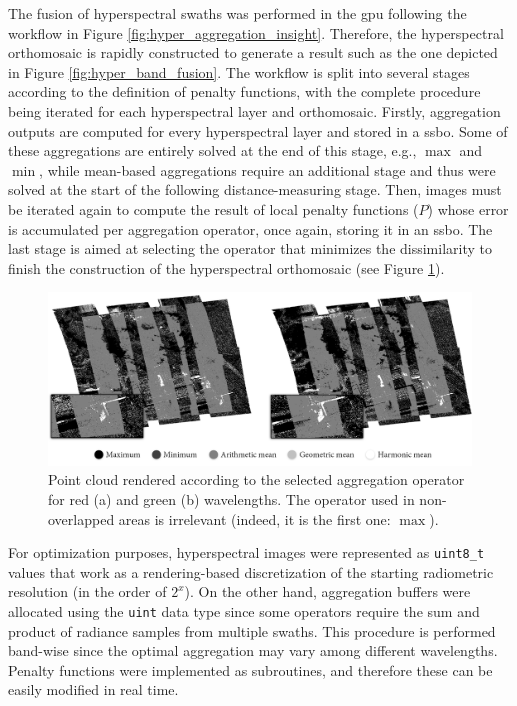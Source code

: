 The fusion of hyperspectral swaths was performed in the \acrshort{gpu} following the workflow in Figure \ref{fig:hyper_aggregation_insight}. Therefore, the hyperspectral orthomosaic is rapidly constructed to generate a result such as the one depicted in Figure \ref{fig:hyper_band_fusion}. The workflow is split into several stages according to the definition of penalty functions, with the complete procedure being iterated for each hyperspectral layer and orthomosaic. Firstly, aggregation outputs are computed for every hyperspectral layer and stored in a \acrshort{ssbo}. Some of these aggregations are entirely solved at the end of this stage, e.g., $\max$ and $\min$, while mean-based aggregations require an additional stage and thus were solved at the start of the following distance-measuring stage. Then, images must be iterated again to compute the result of local penalty functions ($P$) whose error is accumulated per aggregation operator, once again, storing it in an \acrshort{ssbo}. The last stage is aimed at selecting the operator that minimizes the dissimilarity to finish the construction of the hyperspectral orthomosaic (see Figure \ref{fig:hyper_aggregation_selection}). 

\begin{figure}[hbt]
    \centering
    \includegraphics[width=\linewidth]{figs/hyper_point_cloud/aggregation_selection.png}
	\caption{Point cloud rendered according to the selected aggregation operator for red (a) and green (b) wavelengths. The operator used in non-overlapped areas is irrelevant (indeed, it is the first one: $\max$). }
	\label{fig:hyper_aggregation_selection}
\end{figure}

For optimization purposes, hyperspectral images were represented as \verb|uint8_t| values that work as a rendering-based discretization of the starting radiometric resolution (in the order of $2^x$). On the other hand, aggregation buffers were allocated using the \verb|uint| data type since some operators require the sum and product of radiance samples from multiple swaths. This procedure is performed band-wise since the optimal aggregation may vary among different wavelengths. Penalty functions were implemented as subroutines, and therefore these can be easily modified in real time.

